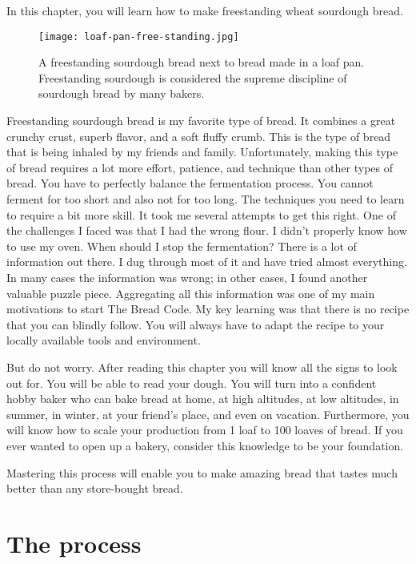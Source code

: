In this chapter, you will learn how to make
freestanding wheat sourdough bread.

\begin{figure}[!htb]
  \texttt{[image: loaf-pan-free-standing.jpg]}
  \caption{A freestanding sourdough bread next to bread made in a loaf pan.
  Freestanding sourdough is considered the supreme discipline of sourdough bread by many bakers.
  }
\end{figure}

Freestanding sourdough bread is my favorite
type of bread. It combines a great crunchy crust, superb
flavor, and a soft fluffy crumb. This is the type of bread
that is being inhaled by my friends and family. Unfortunately,
making this type of bread requires a lot more effort, patience,
and technique than other types of bread. You have to perfectly
balance the fermentation process. You cannot ferment for too
short and also not for too long. The techniques you need to
learn to require a bit more skill. It took me several attempts
to get this right. One of the challenges I faced was that
I had the wrong flour. I didn't properly know how to use my oven.
When should I stop the fermentation? There is a lot of information
out there. I dug through most of it and have tried almost everything.
In many cases the information was wrong; in other cases, I
found another valuable puzzle piece. Aggregating all this
information was one of my main motivations to start The Bread Code.
My key learning was that there is no recipe that
you can blindly follow. You will always have to adapt the recipe
to your locally available tools and environment.

But do not worry. After reading this chapter you will know
all the signs to look out for. You will be able to read your dough.
You will turn into a confident hobby baker who can bake bread
at home, at high altitudes, at low altitudes, in summer, in winter,
at your friend's place, and even on vacation. Furthermore,
you will know how to scale your production from 1 loaf to 100 loaves of bread.
If you ever wanted to open up a bakery, consider this knowledge to
be your foundation.

Mastering this process will enable you to make amazing bread
that tastes much better than any store-bought bread.

\section{The process}

